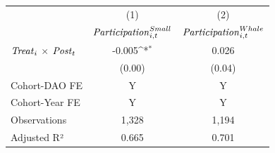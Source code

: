 {
\def\sym#1{\ifmmode^{#1}\else\(^{#1}\)\fi}
\begin{tabular}{l*{2}{c}}
\toprule
                    &\multicolumn{1}{c}{(1)}&\multicolumn{1}{c}{(2)}\\
                    &\multicolumn{1}{c}{${\it Participation}^{Small}_{i,t}$}&\multicolumn{1}{c}{${\it Participation}^{Whale}_{i,t}$}\\
\midrule
${\it Treat}_{i}$ $\times$ ${\it Post}_{t}$&      -0.005\sym{*}  &       0.026         \\
                    &      (0.00)         &      (0.04)         \\
\midrule
Cohort-DAO FE       &           Y         &           Y         \\
Cohort-Year FE      &           Y         &           Y         \\
Observations        &       1,328         &       1,194         \\
Adjusted R²         &       0.665         &       0.701         \\
\bottomrule
\end{tabular}
}
